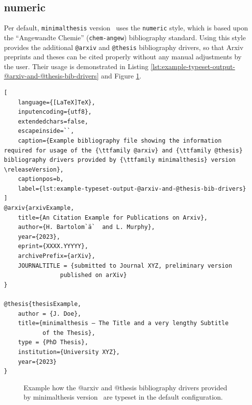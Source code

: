 		\subsection{{\ttfamily numeric}}
			Per default, \verb|minimalthesis| version \releaseVersion~uses the \verb|numeric| style, which is based upon the \enquote{Angewandte Chemie} (\verb|chem-angew|) bibliography standard.  
			\newline Using this style provides the additional \verb|@arxiv| \cite{arxivExample} and \verb|@thesis| \cite{thesisExample} bibliography drivers, so that Arxiv preprints and theses can be cited properly without any manual adjustments by the user. Their usage is demonstrated in Listing \ref{lst:example-typeset-output-@arxiv-and-@thesis-bib-drivers} and Figure \ref{fig:example-typeset-output-@arxiv-and-@thesis-bib-drivers}.
			
\begin{lstlisting}[
	language={[LaTeX]TeX},
	inputencoding={utf8}, 
	extendedchars=false,  
	escapeinside=``,
	caption={Example bibliography file showing the information required for usage of the {\ttfamily @arxiv} and {\ttfamily @thesis} bibliography drivers provided by {\ttfamily minimalthesis} version \releaseVersion},
	captionpos=b,
	label={lst:example-typeset-output-@arxiv-and-@thesis-bib-drivers}
]
@arxiv{arxivExample,
	title={An Citation Example for Publications on Arxiv},
	author={H. Bartolom`ä`  and L. Murphy},
	year={2023},
	eprint={XXXX.YYYYY},
	archivePrefix={arXiv},
	JOURNALTITLE = {submitted to Journal XYZ, preliminary version 
		        published on arXiv}
}

@thesis{thesisExample,
	author = {J. Doe},
	title={minimalthesis – The Title and a very lengthy Subtitle
	       of the Thesis},
	type = {PhD Thesis},
	institution={University XYZ},
	year={2023}
}	
\end{lstlisting}
			
			\begin{figure}[h!]
				\centering
				\caption{Example how the {\ttfamily @arxiv} and {\ttfamily @thesis} bibliography drivers provided by {\ttfamily minimalthesis} version \releaseVersion~are typeset in the default configuration.}
				\label{fig:example-typeset-output-@arxiv-and-@thesis-bib-drivers}
			\end{figure}
			
